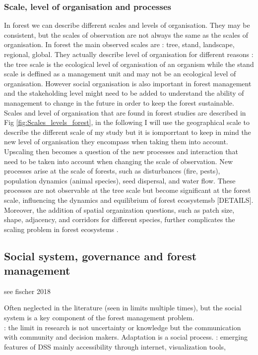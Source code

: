 \documentclass{article}
\begin{document}
\subsubsection{Scale, level of organisation and processes}

In forest we can describe different scales and levels of organisation. They may be consistent, but the scales of observation are not always the same as the scales of organisation. In forest the main observed scales are : tree, stand, landscape, regional, global. They actually describe level of organisation for different reasons : the tree scale is the ecological level of organisation of an organism while the stand scale is deffined as a management unit and may not be an ecological level of organisation. However social organisation is also important in forest management and the stakeholding level might need to be added to understand the ability of management to change in the future in order to keep the forest sustainable. Scales and level of organisation that are found in forest studies are described in Fig \ref{fig:Scales_levels_forest}, in the following I will use the geographical scale to describe the different scale of my study but it is iomporrtant to keep in mind the new level of organisation they encompass when taking them into account. \\

Upscaling then becomes a question of the new processes and interaction that need to be taken into account when changing the scale of observation. New processes arise at the scale of forests, such as disturbances (fire, pests), population dynamics (animal species), seed dispersal, and water flow. These processes are not observable at the tree scale but become significant at the forest scale, influencing the dynamics and equilibrium of forest ecosystemsb [DETAILS]. Moreover, the addition of spatial organization questions, such as patch size, shape, adjacency, and corridors for different species, further complicates the scaling problem in forest ecosystems \cite{baskentSpatialForestPlanning2005}. \\

\subsection{Social system, governance and forest management}

see fischer 2018

Often neglected in the literature (seen in limits multiple times), but the social system is a key component of the forest management problem. \\
\cite{mannAssessingForestGovernance2021}
\cite{keenanClimateChangeImpacts2015}: the limit in research is not uncertainty or knowledge but the communication with community and decision makers. Adaptation is a social process.
\cite{vacikCurrentFutureDrivers2014}: emerging features of DSS mainly accessibility through internet, visualization tools, 
\end{document}
